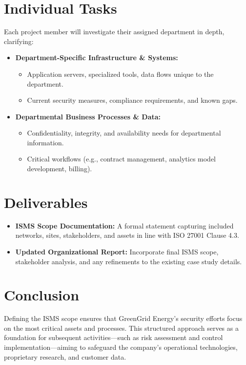 \section{Individual Tasks}
Each project member will investigate their assigned department in depth, clarifying:
\begin{itemize}
    \item \textbf{Department-Specific Infrastructure \& Systems:}
    \begin{itemize}
        \item Application servers, specialized tools, data flows unique to the department.
        \item Current security measures, compliance requirements, and known gaps.
    \end{itemize}
    \item \textbf{Departmental Business Processes \& Data:}
    \begin{itemize}
        \item Confidentiality, integrity, and availability needs for departmental information.
        \item Critical workflows (e.g., contract management, analytics model development, billing).
    \end{itemize}
\end{itemize}

\section{Deliverables}
\begin{itemize}
    \item \textbf{ISMS Scope Documentation:} A formal statement capturing included networks, sites, stakeholders, and assets in line with ISO 27001 Clause 4.3.
    \item \textbf{Updated Organizational Report:} Incorporate final ISMS scope, stakeholder analysis, and any refinements to the existing case study details.
\end{itemize}

\section{Conclusion}
Defining the ISMS scope ensures that GreenGrid Energy’s security efforts focus on the most critical assets and processes. This structured approach serves as a foundation for subsequent activities—such as risk assessment and control implementation—aiming to safeguard the company’s operational technologies, proprietary research, and customer data.


